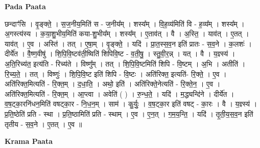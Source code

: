 \documentclass[17pt]{extarticle}
\begin{document}
\textbf{Pada Paata} \newline

छन्दाꣳ॑सि । वृ॒ङ्क्ते॒ । स॒ज॒नीय॒मिति॑ स - ज॒नीय᳚म् । शस्य᳚म् । वि॒ह॒व्य॑मिति॑ वि - ह॒व्य᳚म् । शस्य᳚म् । अ॒गस्त्य॑स्य । क॒या॒शु॒भीय॒मिति॑ कया-शु॒भीय᳚म् । शस्य᳚म् । ए॒ताव॑त् । वै । अ॒स्ति॒ । याव॑त् । ए॒तत् । याव॑त् । ए॒व । अस्ति॑ । तत् । ए॒षा॒म् । वृ॒ङ्क्ते॒ । यदि॑ । प्रा॒त॒स्स॒व॒न इति॑ प्रातः - स॒व॒ने । क॒लशः॑ । दीर्ये॑त । वै॒ष्ण॒वीषु॑ । शि॒पि॒वि॒ष्टव॑ती॒ष्विति॑ शिपिवि॒ष्ट - व॒ती॒षु॒ । स्तु॒वी॒र॒न्न् । यत् । वै । य॒ज्ञ्स्य॑ । अ॒ति॒रिच्य॑त॒ इत्य॑ति - रिच्य॑ते । विष्णु᳚म् । तत् । शि॒पि॒वि॒ष्टमिति॑ शिपि - वि॒ष्टम् । अ॒भि । अतीति॑ । रि॒च्य॒ते॒ । तत् । विष्णुः॑ । शि॒पि॒वि॒ष्ट इति॑ शिपि - वि॒ष्टः । अति॑रिक्त॒ इत्यति॑- रि॒क्ते॒ । ए॒व । अति॑रिक्त॒मित्यति॑ - रि॒क्त॒म् । द॒धा॒ति॒ । अथो॒ इति॑ । अति॑रिक्ते॒नेत्यति॑ - रि॒क्ते॒न॒ । ए॒व । अति॑रिक्त॒मित्यति॑ - रि॒क्त॒म् । आ॒प्त्वा । अवेति॑ ( ) । रु॒न्ध॒ते॒ । यदि॑ । म॒द्ध्यन्दि॑ने । दीर्ये॑त । व॒ष॒ट्का॒रनि॑धन॒मिति॑ वषट्का॒र - नि॒ध॒न॒म् । साम॑ । कु॒र्युः॒ । व॒ष॒ट्का॒र इति॑ वषट् - का॒रः । वै । य॒ज्ञ्स्य॑ । प्र॒ति॒ष्ठेति॑ प्रति - स्था । प्र॒ति॒ष्ठामिति॑ प्रति - स्थाम् । ए॒व । ए॒न॒त् । ग॒म॒य॒न्ति॒ । यदि॑ । तृ॒ती॒य॒स॒व॒न इति॑ तृतीय - स॒व॒ने । ए॒तत् । ए॒व ॥  \newline


\textbf{Krama Paata} \newline
\end{document}

